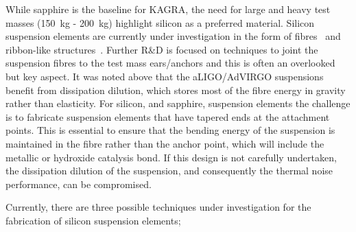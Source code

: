 While sapphire is the baseline for KAGRA, the need for large and heavy test masses (150~kg - 200~kg) highlight silicon as a preferred material.  Silicon suspension elements are currently under investigation in the form of fibres~\cite{articolofibresil} and ribbon-like structures~\cite{Reid2006}. Further R\&D is focused on techniques to joint the suspension fibres to the test mass ears/anchors and this is often an overlooked but key aspect. It was noted above that the aLIGO/AdVIRGO suspensions benefit from dissipation dilution, which stores most of the fibre energy in gravity rather than elasticity. For silicon, and sapphire, suspension elements the challenge is to fabricate suspension elements that have tapered ends at the attachment points. This is essential to ensure that the bending energy of the suspension is maintained in the fibre rather than the anchor point, which will include the metallic or hydroxide catalysis bond. If this design is not carefully undertaken, the dissipation dilution of the suspension, and consequently the thermal noise performance, can be compromised. 

Currently, there are three possible techniques under investigation for the fabrication of silicon suspension elements;

